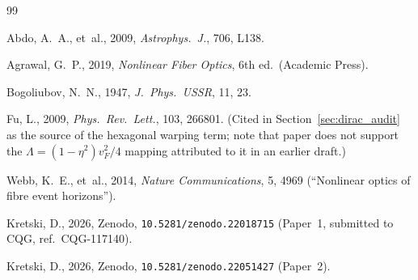\documentclass[12pt,a4paper]{article}
\begin{document}

\begin{thebibliography}{99}

Abdo, A.~A., et~al., 2009, \textit{Astrophys.\ J.}, 706, L138.

Agrawal, G.~P., 2019, \textit{Nonlinear Fiber Optics}, 6th ed.\ (Academic Press).

Bogoliubov, N.~N., 1947, \textit{J.\ Phys.\ USSR}, 11, 23.

Fu, L., 2009, \textit{Phys.\ Rev.\ Lett.}, 103, 266801. (Cited in
Section~\ref{sec:dirac_audit} as the source of the hexagonal warping
term; note that paper does not support the $\Lambda=(1-\eta^2)v_F^2/4$
mapping attributed to it in an earlier draft.)

Webb, K.~E., et~al., 2014, \textit{Nature Communications}, 5, 4969
(``Nonlinear optics of fibre event horizons'').

Kretski, D., 2026, Zenodo, \texttt{10.5281/zenodo.22018715}
(Paper~1, submitted to CQG, ref.\ CQG-117140).

Kretski, D., 2026, Zenodo, \texttt{10.5281/zenodo.22051427}
(Paper~2).

\end{thebibliography}
\end{document}
